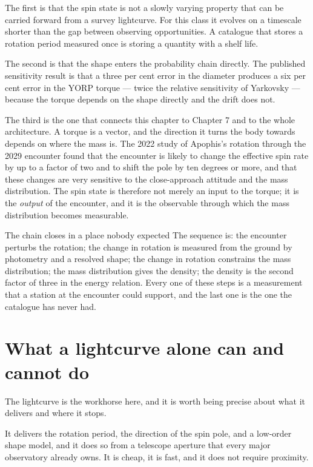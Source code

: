 The first is that the spin state is not a slowly varying property that can
be carried forward from a survey lightcurve. For this class it evolves on a
timescale shorter than the gap between observing opportunities. A catalogue
that stores a rotation period measured once is storing a quantity with a
shelf life.

The second is that the shape enters the probability chain directly. The
published sensitivity result is that a three per cent error in the diameter
produces a six per cent error in the YORP torque --- twice the relative
sensitivity of Yarkovsky --- because the torque depends on the shape
directly and the drift does not.

The third is the one that connects this chapter to Chapter 7 and to the
whole architecture. A torque is a vector, and the direction it turns the
body towards depends on where the mass is. The 2022 study of Apophis's
rotation through the 2029 encounter found that the encounter is likely to
change the effective spin rate by up to a factor of two and to shift the
pole by ten degrees or more, and that these changes are very sensitive to
the close-approach attitude and the mass distribution. The spin state is
therefore not merely an input to the torque; it is the \emph{output} of the
encounter, and it is the observable through which the mass distribution
becomes measurable.

\begin{seamnote}{The chain closes in a place nobody expected}
The sequence is: the encounter perturbs the rotation; the change in
rotation is measured from the ground by photometry and a resolved shape; the
change in rotation constrains the mass distribution; the mass distribution
gives the density; the density is the second factor of three in the energy
relation. Every one of these steps is a measurement that a station at the
encounter could support, and the last one is the one the catalogue has never
had.
\end{seamnote}

\section{What a lightcurve alone can and cannot do}

The lightcurve is the workhorse here, and it is worth being precise about
what it delivers and where it stops.

It delivers the rotation period, the direction of the spin pole, and a
low-order shape model, and it does so from a telescope aperture that every
major observatory already owns. It is cheap, it is fast, and it does not
require proximity.


